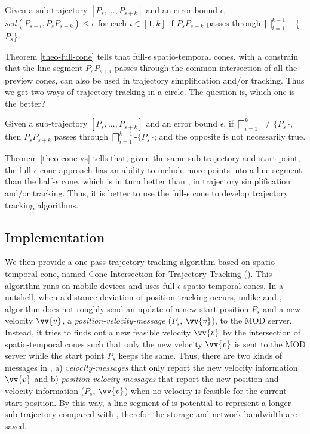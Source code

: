 \begin{theorem}
	\label{theo-full-cone}
	Given a sub-trajectory $[P_s,...,P_{s+k}]$ and an error bound $\epsilon$, $sed(P_{s+i}, \overline{P_sP_{s+k}})\le \epsilon$ for each $i \in [1,k]$ if $\overline{P_sP_{s+k}}$ passes through $\bigsqcap_{i=1}^{k-1}$ - \{$P_s$\}.
\end{theorem}

Theorem \ref{theo-full-cone} tells that full-$\epsilon$ spatio-temporal cones, with a constrain that the line segment $\overline{P_sP_{s+i}}$ passes through the common intersection of all the preview cones, can also be used in trajectory simplification and/or tracking. Thus we get two ways of trajectory tracking in a circle. The question is, which one is the better?

\begin{theorem}
	\label{theo-cone-vs}
	Given a sub-trajectory $[P_s,...,P_{s+k}]$ and an error bound $\epsilon$, if $\bigsqcap_{i=1}^{k}$ $\ne \{P_s\}$, then $\overline{P_sP_{s+k}}$ passes through $\bigsqcap_{i=1}^{k-1}$-$\{P_s\}$; and the opposite is not necessarily true.
\end{theorem}


Theorem \ref{theo-cone-vs} tells that, given the same sub-trajectory and start point, the full-$\epsilon$ cone approach has an ability to include more points into a line segment than the half-$\epsilon$ cone, which is in turn better than \ldrh, in trajectory simplification and/or tracking. Thus, it is better to use the full-$\epsilon$ cone to develop trajectory tracking algorithms.

\subsection{Implementation}
We then provide a one-pass trajectory tracking algorithm based on spatio-temporal cone, named \underline{C}one \underline{I}ntersection for \underline{T}rajectory \underline{T}racking (\citt). This algorithm runs on mobile devices and uses full-$\epsilon$ spatio-temporal cones. In a nutshell, when a distance deviation of position tracking occurs, unlike \ldr and \ldrh, algorithm \citt does not roughly send an update of a new start position $P_s$ and a new velocity $\vv{v}$, \ie a \emph{position-velocity-message} ($P_s$, $\vv{v}$), to the MOD server. Instead, it tries to finds out a new feasible velocity $\vv{v}$ by the intersection of spatio-temporal cones such that only the new velocity $\vv{v}$ is sent to the MOD server while the start point $P_s$ keeps the same. 
Thus, there are two kinds of messages in \citt, a) \emph{velocity-messages} that only report the new velocity information  $\vv{v}$ and b) \emph{position-velocity-messages} that report the new position and velocity information ($P_s$, $\vv{v}$) when no velocity is feasible for the current start position.
By this way, a line segment of \citt is potential to represent a longer sub-trajectory compared with \ldrh, therefor the storage and network bandwidth are saved.

